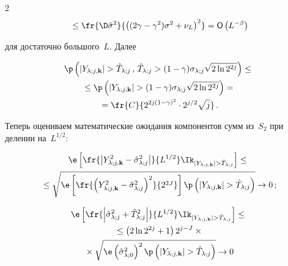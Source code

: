 \begin{multicols}{2}
\begin{multline*}
{}\leq \fr{\D\hsig}{\left((2\gamma-\gamma^2)\sigma^2+\nu_L\right)^2}=\Obig\left(L^{-\beta}\right)


\end{multline*}


для достаточно большого~$L$. Далее


\begin{multline}


\p\left( |\Yljk| > \hTlj \,,\, \hTlj > (1-\gamma)\solj\sqrt{2\ln 2^{2j}} \right) \leq{}\\


{}\leq \p\left( |\Yljk| > (1-\gamma)\solj\sqrt{2\ln 2^{2j}} \right) = {}\\


{}=


\fr{ C }{ 2^{2j(1-\gamma)^2}\cdot 2^{j/2}\sqrt{j} }\,.


\label{eq_prbSplitGammaTomo}


\end{multline}


Теперь оцениваем математические ожидания компонентов сумм из~$S_2$ при делении на~$L^{1/2}$:


\begin{multline*}


\e\left[\fr{\left| \Yljk^2 - \hslj \right|}{L^{1/2}}\indYjkghTj\right] \leq {}\\


{}\leq\sqrt{ \e\left[\fr{ \left(\Yljk^2 - \hslj\right)^2 }{2^{2J}}\right]  \p\left( |\Yljk| > \hTlj \right) } 


\rightarrow 0\,;


\end{multline*}





\vspace*{-6pt}


\noindent


\begin{multline*}


\e\left[\fr{\left| \hslj + \hTlj^2 \right|}{L^{1/2}}\indYjkghTj\right] \leq{}\\


{}\leq 


\left( 2\ln 2^{2j} + 1 \right) 2^{j-J} \times{}\\


{}\times\sqrt{ \e\left(\hslz\right)^2 \p\left( |\Yljk| > \hTlj \right) } \rightarrow 0


\end{multline*}



\end{multicols}
